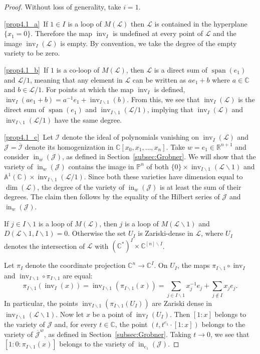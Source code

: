 \documentclass[ALCO,ThmDefs,Unicode,epreuves]{cedram}
\newcommand{\PP}{\mathbb{P}}
\newcommand{\R}{\mathbb{R}}
\newcommand{\Cbb}{\mathbb{C}}
\newcommand{\I}{\mathcal{I}}
\newcommand{\J}{\mathcal{J}}
\newcommand{\cL}{\mathcal{L}}
\newcommand{\ol}{\overline}
\DeclareMathOperator{\In}{in}
\DeclareMathOperator{\inv}{inv}
\DeclareMathOperator{\spanrm}{span}
\begin{document}
\begin{proof} Without loss of generality, take $i = 1$. 

\ref{prop4.1_a}~If $1\in I$ is a loop of $M(\cL)$ then $\cL$ is contained in the hyperplane $\{x_1=0\}$. 
Therefore the map $\inv_I$ is undefined at every point of $\cL$ and the image $\inv_I(\cL)$ is empty. 
By convention, we take the degree of the empty variety to be zero. 

\ref{prop4.1_b}~If $1$ is a co-loop of $M(\cL)$, then $\cL$ is a direct sum of $\spanrm (e_1)$ and $\cL/1$, meaning that 
any element in $\cL$ can be written as $ae_1 + b$ where $a\in \Cbb$ and $b\in \cL/1$. 
For points at which the map $\inv_I$ is defined, $\inv_I(ae_1 + b) = a^{-1}e_1 + \inv_{I\backslash 1}(b)$. 
From this, we see that $\inv_I(\cL)$ is the direct sum of $\spanrm (e_1)$ and $\inv_{I\backslash 1}(\cL/1)$, 
implying that $\inv_{I}(\cL)$ and $\inv_{I\backslash 1}(\cL/1)$ have the same degree. 

\ref{prop4.1_c}~Let $\I$ denote the ideal of polynomials vanishing on $\inv_I(\cL)$ and 
$\J = \ol{\I}$ denote its homogenization in $\Cbb[x_0,x_1,\ldots , x_n]$. 
Take $w = e_1 \in \R^{n+1}$ and consider $\In_w(\J)$, 
as defined in Section~\ref{subsec:Grobner}. 
We will show that the variety of $\In_w(\J)$ contains 
the image in $\PP^n$ of both $\{0\}\times \inv_{I\backslash 1}(\cL\backslash 1)$ and 
$\mathbb{A}^1(\Cbb)\times \inv_{I\backslash 1}(\cL/ 1)$. 
Since both these varieties have dimension equal to $\dim(\cL)$, the degree of the variety of $\In_w(\J)$ is at least the sum of their degrees. 
The claim then follows by the equality of the Hilbert series of $\J$ and $\In_w(\J)$. 


If $j\in I\backslash 1$ is a loop of $M(\cL)$, then $j$ is a loop of $M(\cL\backslash 1)$ and $D(\cL\backslash 1,I\backslash 1)=0$.
Otherwise the set $U_I$ is Zariski-dense in $\cL$, where $U_I$ denotes the intersection of 
$\cL$ with $(\Cbb^*)^I\times \Cbb^{[n]\backslash I}$. 

Let $\pi_I$ denote the coordinate projection $\Cbb^n \rightarrow \Cbb^I$. On $U_I$, the maps 
$\pi_{I\backslash 1}\circ \inv_I$ and $\inv_{I\backslash 1} \circ \pi_{I\backslash 1}$ are equal:
\[\pi_{I\backslash 1}(\inv_I(x))   =   \inv_{I\backslash 1}(\pi_{I\backslash 1}(x))  = 
\sum_{j\in I\backslash 1} x_j^{-1} e_j + \sum_{j\not\in I} x_j e_j. 
\]
In particular, the points $\inv_{I\backslash 1}(\pi_{I\backslash 1}(U_I))$ are Zariski dense in $\inv_{I\backslash 1}(\cL\backslash 1)$. 
Now let $x$ be a point of $ \inv_I(U_I)$. 
Then $[1: x]$ belongs to the variety of $\J$ and, for every $t\in \Cbb$, the point $(t,t^{e_1}\cdot[1:x])$ belongs to the 
variety of $\ol{\J}^{w}$, as defined in Section~\ref{subsec:Grobner}. Taking $t\rightarrow 0$, we see that $[1:0:\pi_{I\backslash 1}(x)]$ belongs to the variety of $\In_{e_1}(\J)$. 



\end{proof}
\end{document}
